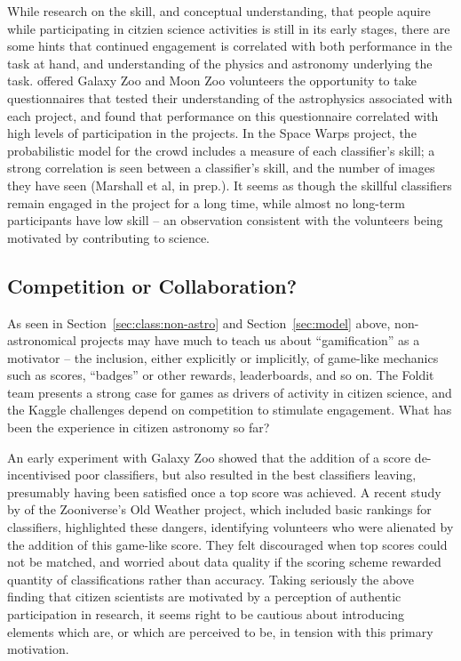 \documentclass{ar2e}
\def\Sref#1{Section~\ref{#1}\xspace}
\begin{document}
While research on the skill, and conceptual understanding, that  people aquire
while participating in citzien science activities is still in its early stages,
there are some hints that continued engagement is correlated with both
performance in the task at hand, and understanding of the physics and astronomy
underlying the task. \citet{Prather++2013} offered Galaxy Zoo and Moon Zoo
volunteers the opportunity to take questionnaires that tested their
understanding of the astrophysics associated with each project, and found that
performance on this questionnaire correlated with high levels of participation
in the projects. In the Space Warps project, the probabilistic model for the
crowd includes a measure of each classifier's skill; a strong correlation is
seen between a classifier's skill, and the number of images they have seen
(Marshall et al, in prep.). It seems as though the skillful classifiers remain
engaged in the project for a long time, while almost no long-term participants
have low skill -- an observation consistent with the volunteers being motivated
by contributing to science.



\subsection{Competition or Collaboration?}
\label{sec:crowd:gamification}

As seen in \Sref{sec:class:non-astro} and \Sref{sec:model}  above,
non-astronomical projects may have much to teach us about ``gamification'' as a
motivator -- the inclusion, either explicitly or implicitly, of game-like
mechanics such as scores, ``badges'' or other rewards, leaderboards, and so on.
The Foldit team presents a strong case for games as drivers of activity in
citizen science, and the Kaggle challenges depend on competition to stimulate
engagement. What has been the experience in citizen astronomy so far?

An early experiment with Galaxy Zoo showed that the addition of a score
de-incentivised poor classifiers, but also resulted in the best classifiers
leaving, presumably having been satisfied once a top score was achieved. A
recent study by \citet{Eveleigh++2013} of the Zooniverse's Old Weather
project, which included basic rankings for classifiers, highlighted these
dangers, identifying volunteers who were alienated by the addition of this
game-like score. They felt discouraged when top scores could not be matched, and
worried about data quality if the scoring scheme rewarded quantity of
classifications rather than accuracy. Taking seriously the above finding  that
citizen scientists are motivated by a perception of authentic participation in
research, it seems right to be cautious about introducing elements which are, or
which are perceived to be, in tension with this primary motivation. 
\end{document}
